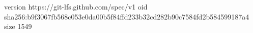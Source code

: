version https://git-lfs.github.com/spec/v1
oid sha256:b9f3067fb568c053e0da00b5f84ffd233b32cd282b90c7584fd2b584599187a4
size 1549
